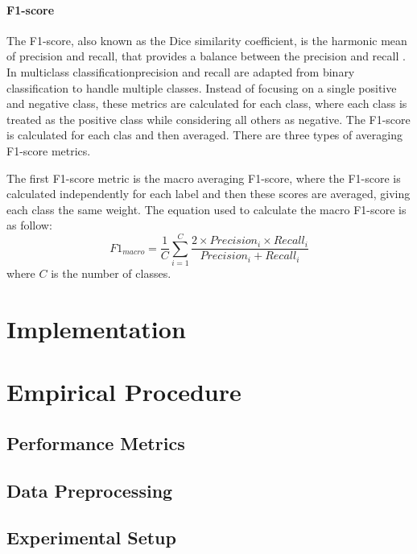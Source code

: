 \documentclass[10pt, conference]{IEEEtran}
\begin{document}
\paragraph{F1-score}

The F1-score, also known as the Dice similarity coefficient, is the harmonic mean of precision and recall,
that provides a balance between the precision and recall \cite{F1-score_ref}.
In multiclass classificationprecision and recall are adapted from binary classification to handle multiple classes.
Instead of focusing on a single positive and negative class, these metrics are calculated for each class,
where each class is treated as the positive class while considering all others as negative. The F1-score
is calculated for each clas and then averaged. There are three types of averaging F1-score metrics.

The first F1-score metric is the macro averaging F1-score, where the F1-score is calculated  independently for each label
and then these scores are averaged, giving each class the same weight. The equation used to calculate the macro F1-score is
as follow:
\begin{equation}
    F1_{macro} = \frac{1}{C} \sum_{i=1}^{C} \frac{2 \times Precision_i \times Recall_i}{Precision_i + Recall_i} \label{macro_F1}
\end{equation}
where $C$ is the number of classes.

\section{Implementation} \label{section: Implementation}

\section{Empirical Procedure} \label{section: Empeirical Procedure}

\subsection{Performance Metrics}

\subsection{Data Preprocessing}

\subsection{Experimental Setup} \label{section: experimental_setup_emp}
\end{document}
